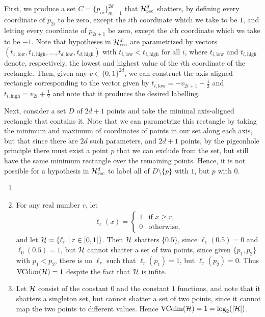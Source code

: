 \begin{ex}
  First, we produce a set $C=\{p_m\}_{m=1}^{2d}$ that $\mathcal{H}_{\text{rec}}^d$ shatters,
  by defining every coordinate of $p_{2i}$ to be zero, except the $i$th coordinate
  which we take to be $1$, and letting every coordinate of ${p_{2i+1}}$ be zero,
  except the $i$th coordinate which we take to be $-1$. Note that hypotheses in $\mathcal{H}_{\text{rec}}^d$ are
  parametrized by vectors $(t_{1,\text{low}}, t_{1,\text{high}},\ldots,t_{d,\text{low}},t_{d,\text{high}})$
  with $t_{i,\text{low}}<t_{i,\text{high}}$ for all $i$, where $t_{i,\text{low}}$ and $t_{i,\text{high}}$ denote,
  respectively, the lowest and highest value of the $i$th coordinate of the rectangle.
  Then, given any $v\in\{0, 1\}^{2d}$, we can construct the axis-aligned rectangle corresponding
  to the vector given by $t_{i,\text{low}}=-v_{2i+1}-\frac{1}{2}$ and $t_{i,\text{high}}=v_{2i}+\frac{1}{2}$
  and note that it produces the desired labelling.

  Next, consider a set $D$ of $2d+1$ points and take the minimal axis-aligned rectangle
  that contains it. Note that we can parametrize this rectangle by taking the minimum and maximum
  of coordinates of points in our set along each axis, but that since there are $2d$ such
  parameters, and $2d+1$ points, by the pigeonhole principle there must exist a point $p$ that
  we can exclude from the set, but still have the same minimum rectangle over the remaining points.
  Hence, it is not possible for a hypothesis in $\mathcal{H}_{\text{rec}}^d$ to label all of $D\setminus\{p\}$ with $1$, but $p$ with $0$.
\end{ex}

\begin{ex}
\end{ex}

\begin{ex}
  \begin{enumerate}
    \item[]
    \item For any real number $r$, let
          \begin{align*}
            \ell_r(x)=\begin{cases}
              1 & \text{if $x \geq r$}, \\
              0 & \text{otherwise},
            \end{cases}
          \end{align*}
          and let $\mathcal{H}=\{\ell_r \mid r\in [0, 1] \}$. Then $\mathcal{H}$ shatters $\{0.5\}$, since $\ell_1(0.5)=0$ and $\ell_0(0.5)=1$,
          but $\mathcal{H}$ cannot shatter a set of two points, since
          given $\{p_1, p_2\}$ with $p_1 < p_2$, there is no $\ell_r$ such that $\ell_r(p_1) = 1$, but $\ell_r(p_2)=0$.
          Thus $\operatorname*{VCdim}(\mathcal{H})=1$ despite the fact that $\mathcal{H}$ is infite.
    \item Let $\mathcal{H}$ consist of the constant $0$ and the constant $1$ functions, and note that it
          shatters a singleton set, but cannot shatter a set of two points, since it cannot map the two
          points to different values. Hence $\operatorname*{VCdim}(\mathcal{H})=1=\log_2(|\mathcal{H}|)$.
  \end{enumerate}
\end{ex}

